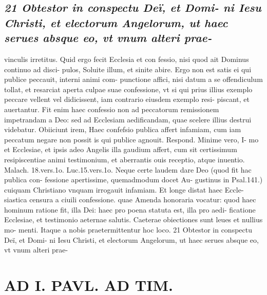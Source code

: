 \documentclass{article}
\begin{document}
\begin{pages}
\subsection*{\textit{21 Obtestor in conspectu Deï, et Domi- ni Iesu Christi, et electorum Angelorum, ut haec serues absque eo, vt vnum alteri prae-}}vinculis irretitus. Quid ergo fecit Ecclesia et con fessio, nisi quod ait Dominus continuo ad disci- pulos, Soluite illum, et sinite abire. Ergo non est satis ei qui publice peccauit, interni animi com- punctione affici, nisi datum a se offendiculum tollat, et resarciat aperta culpae suae confessione, vt si qui prius illius exemplo peccare vellent vel didicissent, iam contrario eiusdem exemplo resi- piscant, et auertantur. Fit enim haec confessio non ad peccatorum remissionem impetrandam a Deo: sed ad Ecclesiam aedificandam, quae scelere illius destrui videbatur. Obiiciunt irem, Haec confefsio publica affert infamiam, cum iam peccatum negare non possit is qui publice agnouit. Respond. Minime vero, I- mo et Ecclesiae, et ipsis adeo Angelis illa gaudium affert, cum sit certissimum resipiscentiae animi testimonium, et aberrantis ouis receptio, atque inuentio. Malach. 18.vers.1o. Luc.15.vers.1o. Neque certe laudem dare Deo (quod fit hac publica con- fessione apertissime, quemadmodum docet Au- gustinus in Psal.141.) cuiquam Christiano vnquam irrogauit infamiam. Et longe distat haec Eccle- siastica censura a ciuili confessione. quae Amenda honoraria vocatur: quod haec hominum ratione fit, illa Dei: haec pro poena statuta est, illa pro aedi- ficatione Ecclesiae, et testimonio aeternae salutis. Caeterae obiectiones sunt leues et nullius mo- menti. Itaque a nobis praetermittentur hoc loco. 21 Obtestor in conspectu Deï, et Domi- ni Iesu Christi, et electorum Angelorum, ut haec serues absque eo, vt vnum alteri prae-  \pend
\section*{AD I. PAVL. AD TIM. }
\marginpar{[ p.628 ]}\pstart {}
{}

\end{pages}
\end{document}
